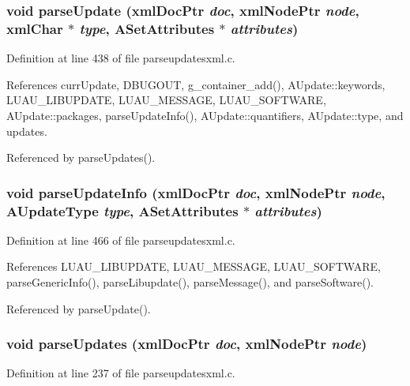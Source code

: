 \subsubsection{\setlength{\rightskip}{0pt plus 5cm}void parse\-Update (xml\-Doc\-Ptr {\em doc}, xml\-Node\-Ptr {\em node}, xml\-Char $\ast$ {\em type}, {\bf ASet\-Attributes} $\ast$ {\em attributes})\hspace{0.3cm}{\tt  [static]}}\label{parseupdatesxml_8c_a4}




Definition at line 438 of file parseupdatesxml.c.

References curr\-Update, DBUGOUT, g\_\-container\_\-add(), AUpdate::keywords, LUAU\_\-LIBUPDATE, LUAU\_\-MESSAGE, LUAU\_\-SOFTWARE, AUpdate::packages, parse\-Update\-Info(), AUpdate::quantifiers, AUpdate::type, and updates.

Referenced by parse\-Updates().
\subsubsection{\setlength{\rightskip}{0pt plus 5cm}void parse\-Update\-Info (xml\-Doc\-Ptr {\em doc}, xml\-Node\-Ptr {\em node}, {\bf AUpdate\-Type} {\em type}, {\bf ASet\-Attributes} $\ast$ {\em attributes})\hspace{0.3cm}{\tt  [static]}}\label{parseupdatesxml_8c_a15}




Definition at line 466 of file parseupdatesxml.c.

References LUAU\_\-LIBUPDATE, LUAU\_\-MESSAGE, LUAU\_\-SOFTWARE, parse\-Generic\-Info(), parse\-Libupdate(), parse\-Message(), and parse\-Software().

Referenced by parse\-Update().
\subsubsection{\setlength{\rightskip}{0pt plus 5cm}void parse\-Updates (xml\-Doc\-Ptr {\em doc}, xml\-Node\-Ptr {\em node})\hspace{0.3cm}{\tt  [static]}}\label{parseupdatesxml_8c_a3}




Definition at line 237 of file parseupdatesxml.c.


